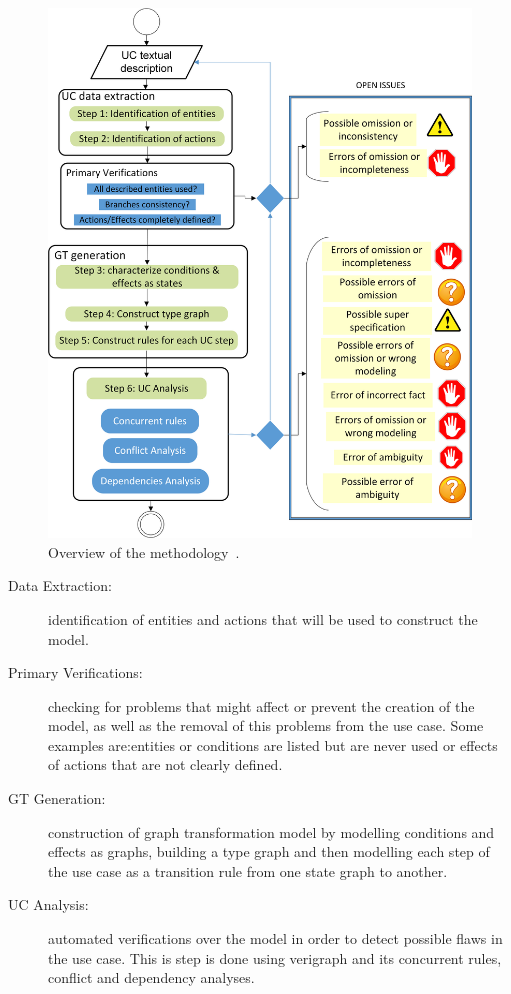 \begin{figure}[!ht]
  \centering
  \includegraphics[scale=0.7]{images/generating-tests/methodology}
  \caption{Overview of the methodology~\cite{Junior2015}.}\label{fig:tests:methodology}
\end{figure}

\begin{description}
  \item[Data Extraction:] identification of entities and actions that will be used to construct the model.

  \item[Primary Verifications:] checking for problems that might affect or prevent the creation of the model, as well as the removal of this problems from the use case. Some examples are:entities or conditions are listed but are never used or effects of actions that are not clearly defined.

  \item[GT Generation:] construction of graph transformation model by modelling conditions and effects as graphs, building a type graph and then modelling each step of the use case as a transition rule from one state graph to another.

  \item[UC Analysis:] automated verifications over the model in order to detect possible flaws in the use case. This is step is done using verigraph and its concurrent rules, conflict and dependency analyses.
\end{description}

